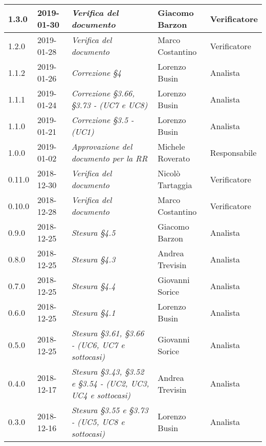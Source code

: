 \begin{longtable}{C{2cm}|C{2.5cm}|C{4.5cm}|C{2.5cm}|C{3cm}}
		1.3.0 & 2019-01-30 & \emph{Verifica del documento} & Giacomo Barzon & Verificatore \\
		\hline
		
		1.2.0 & 2019-01-28 & \emph{Verifica del documento} & Marco Costantino & Verificatore \\
		\hline
	
		1.1.2 & 2019-01-26 & \emph{Correzione §4} & Lorenzo Busin & Analista \\
		\hline
	
		1.1.1 & 2019-01-24 & \emph{Correzione §3.66, §3.73 - (UC7 e UC8)} & Lorenzo Busin & Analista \\
		\hline	
	
		1.1.0 & 2019-01-21 & \emph{Correzione §3.5 - (UC1)} & Lorenzo Busin & Analista \\
		\hline
		
		1.0.0 & 2019-01-02 & \emph{Approvazione del documento per la RR} & Michele Roverato & Responsabile \\
		\hline
		
		0.11.0 & 2018-12-30 & \emph{Verifica del documento} & Nicolò Tartaggia & Verificatore \\
		\hline
		
		0.10.0 & 2018-12-28 & \emph{Verifica del documento} & Marco Costantino & Verificatore \\
		\hline
		
		0.9.0 & 2018-12-25 & \emph{Stesura §4.5} & Giacomo Barzon & Analista \\
		\hline
		
		0.8.0 & 2018-12-25 & \emph{Stesura §4.3} & Andrea Trevisin & Analista \\
		\hline
		
		0.7.0 & 2018-12-25 & \emph{Stesura §4.4} & Giovanni Sorice & Analista \\
		\hline
		
		0.6.0 & 2018-12-25 & \emph{Stesura §4.1} & Lorenzo Busin & Analista \\
		\hline
		
		0.5.0 & 2018-12-25 & \emph{Stesura §3.61, §3.66 - (UC6, UC7 e sottocasi)} & Giovanni Sorice & Analista \\
		\hline
		
		0.4.0 & 2018-12-17 & \emph{Stesura §3.43, §3.52 e §3.54 - (UC2, UC3, UC4 e sottocasi)} & Andrea Trevisin & Analista \\
		\hline
		
		0.3.0 & 2018-12-16 & \emph{Stesura §3.55 e §3.73 - (UC5, UC8 e sottocasi)} & Lorenzo Busin & Analista \\
		\hline
		

\end{longtable}
